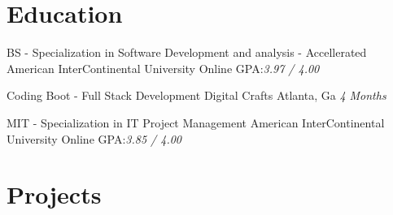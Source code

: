 \documentclass{resume-class/nadario_resume}
\begin{document}
\makecvtitle{}

\section{Education}
        {BS - Specialization in Software Development and analysis - Accellerated}
        {American InterContinental University}
        {Online}
        {GPA:\textit{3.97 / 4.00}}{}

        {Coding Boot - Full Stack Development}
        {Digital Crafts}
        {Atlanta, Ga}
        {\textit{4 Months}}{}

        {MIT - Specialization in IT Project Management}
        {American InterContinental University}
        {Online}
        {GPA:\textit{3.85 / 4.00}}{}

\section{Projects}
\end{document}
